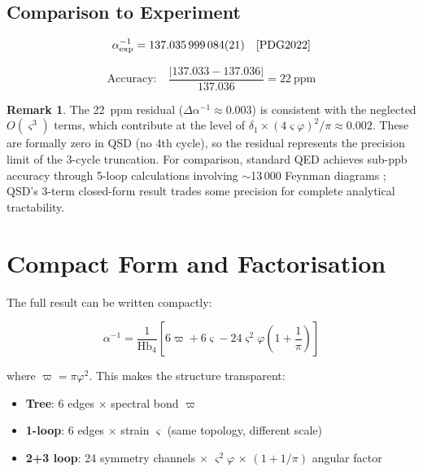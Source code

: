 \documentclass[11pt,a4paper]{article}
\theoremstyle{definition}
\newtheorem{remark}[theorem]{Remark}
\newcommand{\Hbfour}{\mathrm{Hb}_4}
\newcommand{\gs}{\varsigma}
\begin{document}
\subsection{Comparison to Experiment}

\begin{equation}
\alpha^{-1}_{\text{exp}} = 137.035\,999\,084(21) \quad\text{\cite{PDG2022}}
\end{equation}

\begin{equation}
\text{Accuracy:}\quad \frac{|137.033 - 137.036|}{137.036} = 22~\text{ppm}
\end{equation}

\begin{remark}
The 22~ppm residual ($\Delta\alpha^{-1} \approx 0.003$) is consistent with the neglected $O(\gs^3)$ terms, which contribute at the level of $\delta_1 \times (4\gs\varphi)^2/\pi \approx 0.002$. These are formally zero in QSD (no 4th cycle), so the residual represents the precision limit of the 3-cycle truncation. For comparison, standard QED achieves sub-ppb accuracy through 5-loop calculations involving $\sim$13\,000 Feynman diagrams \cite{Schwinger1948,Aoyama2020,Morel2020}; QSD's 3-term closed-form result trades some precision for complete analytical tractability.
\end{remark}

\section{Compact Form and Factorisation}
\label{sec:compact}

The full result can be written compactly:

\begin{equation}
\boxed{\alpha^{-1} = \frac{1}{\Hbfour}\left[6\varpi + 6\gs - 24\gs^2\varphi\left(1 + \frac{1}{\pi}\right)\right]}
\label{eq:compact}
\end{equation}

where $\varpi = \pi\varphi^2$. This makes the structure transparent:
\begin{itemize}[nosep]
    \item \textbf{Tree}: 6 edges $\times$ spectral bond $\varpi$
    \item \textbf{1-loop}: 6 edges $\times$ strain $\gs$ (same topology, different scale)
    \item \textbf{2+3 loop}: 24 symmetry channels $\times$ $\gs^2\varphi$ $\times$ $(1 + 1/\pi)$ angular factor
\end{itemize}
\end{document}
